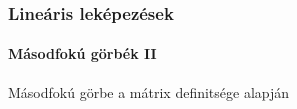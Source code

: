 \begin{frame}
  \frametitle{Lineáris leképezések}
  \framesubtitle{Másodfokú görbék II}

  \begin{block}{Másodfokú görbe a mátrix definitsége alapján}
    \centering
  \end{block}

  
\end{frame}
